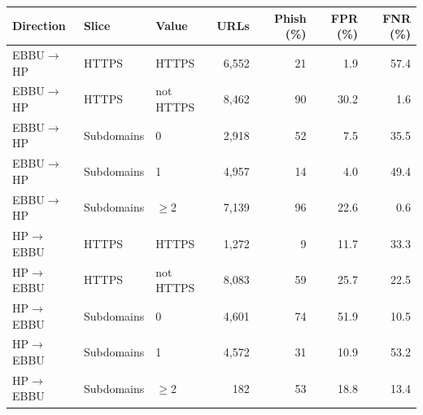 \begin{tabular}{lllrrrr}
\toprule
Direction & Slice & Value & URLs & Phish (\%) & FPR (\%) & FNR (\%) \\
\midrule
EBBU$\rightarrow$HP & HTTPS & HTTPS & 6,552 & 21 & 1.9 & 57.4 \\
EBBU$\rightarrow$HP & HTTPS & not HTTPS & 8,462 & 90 & 30.2 & 1.6 \\
EBBU$\rightarrow$HP & Subdomains & 0 & 2,918 & 52 & 7.5 & 35.5 \\
EBBU$\rightarrow$HP & Subdomains & 1 & 4,957 & 14 & 4.0 & 49.4 \\
EBBU$\rightarrow$HP & Subdomains & $\geq$2 & 7,139 & 96 & 22.6 & 0.6 \\
\midrule
HP$\rightarrow$EBBU & HTTPS & HTTPS & 1,272 & 9 & 11.7 & 33.3 \\
HP$\rightarrow$EBBU & HTTPS & not HTTPS & 8,083 & 59 & 25.7 & 22.5 \\
HP$\rightarrow$EBBU & Subdomains & 0 & 4,601 & 74 & 51.9 & 10.5 \\
HP$\rightarrow$EBBU & Subdomains & 1 & 4,572 & 31 & 10.9 & 53.2 \\
HP$\rightarrow$EBBU & Subdomains & $\geq$2 & 182 & 53 & 18.8 & 13.4 \\
\bottomrule
\end{tabular}
